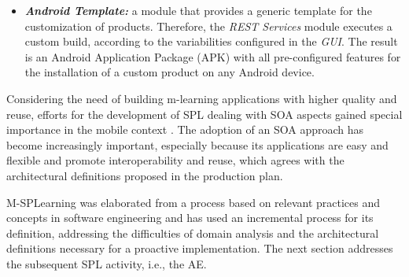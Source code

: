 \begin{itemize}
	\item \textbf{\textit{Android Template:}} a module that provides a generic template for the customization of products. Therefore, the \textit{REST Services} module executes a custom build, according to the variabilities configured in the \textit{GUI}. The result is an Android Application Package (APK) with all pre-configured features for the installation of a custom product on any Android device.
\end{itemize}

Considering the need of building m-learning applications with higher quality and reuse, efforts for the development of SPL dealing with SOA aspects gained special importance in the mobile context \cite{marinho10,nascimento11}. The adoption of an SOA approach has become increasingly important, especially because its applications are easy and flexible and promote interoperability and reuse, which agrees with the architectural definitions proposed in the production plan.

M-SPLearning was elaborated from a process based on relevant practices and concepts in software engineering and has used an incremental process for its definition, addressing the difficulties of domain analysis and the architectural definitions necessary for a proactive implementation. The next section addresses the subsequent SPL activity, i.e., the AE.


